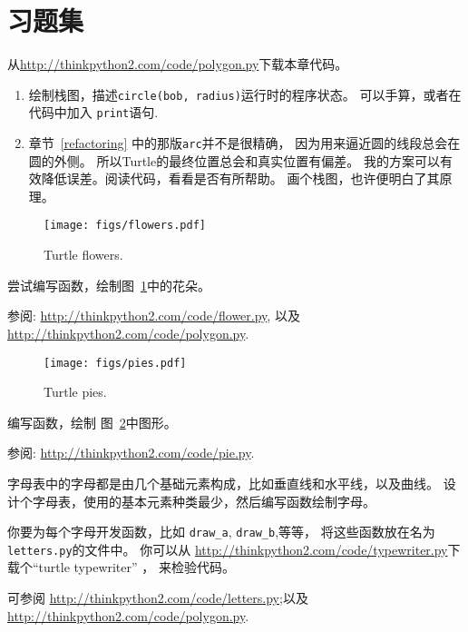 \documentclass[10pt]{book}
\begin{document}
\section{习题集}

\begin{exercise}

从\url{http://thinkpython2.com/code/polygon.py}下载本章代码。

\begin{enumerate}

\item 绘制栈图，描述{\tt circle(bob, radius)}运行时的程序状态。
可以手算，或者在代码中加入 {\tt print}语句.

\item 章节~\ref{refactoring} 中的那版{\tt arc}并不是很精确，
因为用来逼近圆的线段总会在圆的外侧。
所以Turtle的最终位置总会和真实位置有偏差。
我的方案可以有效降低误差。阅读代码，看看是否有所帮助。
画个栈图，也许便明白了其原理。

\end{enumerate}

\end{exercise}

\begin{figure}
\centerline
{\texttt{[image: figs/flowers.pdf]}}
\caption{Turtle flowers.}
\label{fig.flowers}
\end{figure}

\begin{exercise}

尝试编写函数，绘制图~\ref{fig.flowers}中的花朵。

参阅: \url{http://thinkpython2.com/code/flower.py},
以及 \url{http://thinkpython2.com/code/polygon.py}.

\end{exercise}

\begin{figure}
\centerline
{\texttt{[image: figs/pies.pdf]}}
\caption{Turtle pies.}
\label{fig.pies}
\end{figure}


\begin{exercise}

编写函数，绘制 图~\ref{fig.pies}中图形。

参阅: \url{http://thinkpython2.com/code/pie.py}.

\end{exercise}

\begin{exercise}

字母表中的字母都是由几个基础元素构成，比如垂直线和水平线，以及曲线。
设计个字母表，使用的基本元素种类最少，然后编写函数绘制字母。

你要为每个字母开发函数，比如 \verb"draw_a", \verb"draw_b",等等，
将这些函数放在名为{\tt letters.py}的文件中。
你可以从 \url{http://thinkpython2.com/code/typewriter.py}下载个``turtle typewriter'' ，
来检验代码。

可参阅 \url{http://thinkpython2.com/code/letters.py};以及
\url{http://thinkpython2.com/code/polygon.py}.

\end{exercise}
\end{document}
